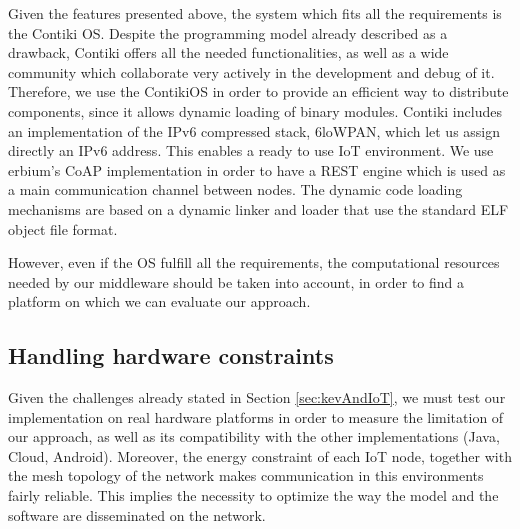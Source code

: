 Given the features presented above, the system which fits all the requirements is the Contiki OS.
Despite the programming model already described as a drawback, Contiki offers all the needed functionalities, as well as a wide community which collaborate very actively in the development and debug of it.
Therefore, we use the ContikiOS\cite{dunkels2004contiki} in order to provide an efficient way to distribute components, since it allows dynamic loading of binary modules.
Contiki includes an implementation of the IPv6 compressed stack, 6loWPAN\cite{rfc4944}, which let us assign directly an IPv6 address. 
This enables a ready to use IoT environment.
We use erbium's\cite{rfc7252} CoAP implementation in order to have a REST engine which is used as a main communication channel between nodes. The dynamic code loading mechanisms are based on a dynamic linker and loader that use the standard ELF object file format\cite{dunkels06runtime}.

However, even if the OS fulfill all the requirements, the computational resources needed by our middleware should be taken into account, in order to find a platform on which we can evaluate our approach.


\subsection{Handling hardware constraints}

Given the challenges already stated in Section \ref{sec:kevAndIoT}, we must test our implementation on real hardware platforms in order to measure the limitation of our approach, as well as its compatibility with the other implementations (Java, Cloud, Android).
Moreover, the energy constraint of each IoT node, together with the mesh topology of the network makes communication in this environments fairly reliable.
This implies the necessity to optimize the way the model and the software are disseminated on the network.

